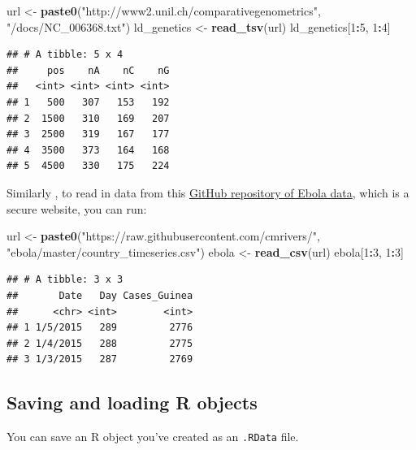 \documentclass[]{book}
\makeatletter
\newenvironment{Shaded}{\begin{snugshade}}{\end{snugshade}}
\newcommand{\KeywordTok}[1]{\textcolor[rgb]{0.13,0.29,0.53}{\textbf{#1}}}
\newcommand{\DecValTok}[1]{\textcolor[rgb]{0.00,0.00,0.81}{#1}}
\newcommand{\StringTok}[1]{\textcolor[rgb]{0.31,0.60,0.02}{#1}}
\newcommand{\OperatorTok}[1]{\textcolor[rgb]{0.81,0.36,0.00}{\textbf{#1}}}
\newcommand{\NormalTok}[1]{#1}
\newenvironment{kframe}{%
\medskip{}
\setlength{\fboxsep}{.8em}
 \def\at@end@of@kframe{}%
 \ifinner\ifhmode%
  \def\at@end@of@kframe{\end{minipage}}%
  \begin{minipage}{\columnwidth}%
 \fi\fi%
 \def\FrameCommand##1{\hskip\@totalleftmargin \hskip-\fboxsep
 \colorbox{shadecolor}{##1}\hskip-\fboxsep
     \hskip-\linewidth \hskip-\@totalleftmargin \hskip\columnwidth}%
 \MakeFramed {\advance\hsize-\width
   \@totalleftmargin\z@ \linewidth\hsize
   \@setminipage}}%
 {\par\unskip\endMakeFramed%
 \at@end@of@kframe}
\renewenvironment{Shaded}{\begin{kframe}}{\end{kframe}}
\theoremstyle{definition}
\theoremstyle{definition}
\theoremstyle{definition}
\theoremstyle{remark}
\makeatother
\begin{document}
\begin{Shaded}
\begin{Highlighting}[]
\NormalTok{url <-}\StringTok{ }\KeywordTok{paste0}\NormalTok{(}\StringTok{"http://www2.unil.ch/comparativegenometrics"}\NormalTok{,}
              \StringTok{"/docs/NC_006368.txt"}\NormalTok{)}
\NormalTok{ld_genetics <-}\StringTok{ }\KeywordTok{read_tsv}\NormalTok{(url)}
\NormalTok{ld_genetics[}\DecValTok{1}\OperatorTok{:}\DecValTok{5}\NormalTok{, }\DecValTok{1}\OperatorTok{:}\DecValTok{4}\NormalTok{]}
\end{Highlighting}
\end{Shaded}

\begin{verbatim}
## # A tibble: 5 x 4
##     pos    nA    nC    nG
##   <int> <int> <int> <int>
## 1   500   307   153   192
## 2  1500   310   169   207
## 3  2500   319   167   177
## 4  3500   373   164   168
## 5  4500   330   175   224
\end{verbatim}

Similarly , to read in data from this
\href{https://raw.githubusercontent.com/cmrivers/ebola/master/country_timeseries.csv}{GitHub
repository of Ebola data}, which is a secure website, you can run:

\begin{Shaded}
\begin{Highlighting}[]
\NormalTok{url <-}\StringTok{ }\KeywordTok{paste0}\NormalTok{(}\StringTok{"https://raw.githubusercontent.com/cmrivers/"}\NormalTok{,}
              \StringTok{"ebola/master/country_timeseries.csv"}\NormalTok{)}
\NormalTok{ebola <-}\StringTok{ }\KeywordTok{read_csv}\NormalTok{(url)}
\NormalTok{ebola[}\DecValTok{1}\OperatorTok{:}\DecValTok{3}\NormalTok{, }\DecValTok{1}\OperatorTok{:}\DecValTok{3}\NormalTok{]}
\end{Highlighting}
\end{Shaded}

\begin{verbatim}
## # A tibble: 3 x 3
##       Date   Day Cases_Guinea
##      <chr> <int>        <int>
## 1 1/5/2015   289         2776
## 2 1/4/2015   288         2775
## 3 1/3/2015   287         2769
\end{verbatim}

\subsection{Saving and loading R
objects}\label{saving-and-loading-r-objects}

You can save an R object you've created as an \texttt{.RData} file.
\end{document}
